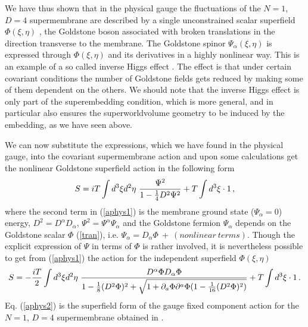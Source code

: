 \documentclass[a4paper,12pt]{article}
\begin{document}
We have thus shown that in the physical gauge the fluctuations of
the $N=1$, $D=4$ supermembrane are described by a single
unconstrained scalar superfield $\Phi(\xi,\eta)$ , the Goldstone
boson associated with broken translations in the direction
transverse to the membrane. The Goldstone spinor
$\Psi_\alpha(\xi,\eta)$ is expressed through $\Phi(\xi,\eta)$ and
its derivatives in a highly nonlinear way. This is an example of
a so called inverse Higgs effect \cite{ivanov}. The effect is that
under certain covariant conditions the number of Goldstone fields
gets reduced by making some of them dependent on the others. We
should note that the inverse Higgs effect is only part of the
superembedding condition, which is more general, and in
particular also ensures the superworldvolume geometry to be
induced by the embedding, as we have seen above.

We can now substitute the expressions, which we have found in the
physical gauge, into the covariant supermembrane action and upon
some calculations get the nonlinear Goldstone superfield action
in the following form
\begin{equation}\label{aphys1}
S=iT\int d^3\xi d^2\eta~{\Psi^2\over{1-{1\over 4}D^2\Psi^2}}+T\int
d^3\xi\cdot 1\, ,
\end{equation}
where the second term in (\ref{aphys1}) is the membrane ground
state ($\Psi_\alpha=0$) energy,
$D^2=D^\alpha D_\alpha$,
$\Psi^2=\Psi^\alpha\Psi_\alpha$ and the Goldstone fermion
$\Psi_\alpha$ depends on the Goldstone scalar $\Phi$
(\ref{tran}), i.e. $\Psi_\alpha=D_\alpha\Phi~ +
~(nonlinear~terms)$. Though the explicit expression of $\Psi$ in
terms of $\Phi$ is rather involved, it is nevertheless possible
to get from (\ref{aphys1}) the action for the independent
superfield
$\Phi(\xi,\eta)$ \cite{pst}
\begin{equation}\label{aphys2}
S=-{iT\over 2}\int d^3\xi d^2\eta~{D^\alpha\Phi
D_\alpha\Phi\over{1-{1\over
8}(D^2\Phi)^2}+\sqrt{1+\partial_a\Phi\partial^a\Phi(1-{1\over
16}(D^2\Phi)^2)}}+T\int d^3\xi\cdot 1\, .
\end{equation}
Eq. (\ref{aphys2}) is the superfield form of the gauge fixed
component action for the $N=1$, $D=4$ supermembrane obtained in
\cite{achu}.
\end{document}
